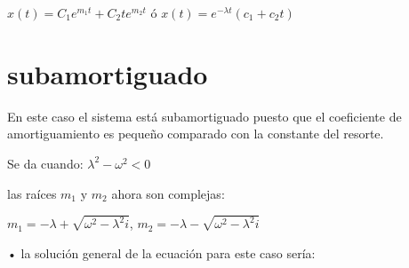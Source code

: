 \documentclass[12pt,a4paper]{article}
\begin{document}
 
 $x(t) = C_{1}e^{m_{1}t} + C_{2}te^{m_{2}t}$ \hspace{0.8cm} ó \hspace{0.8cm} $x(t) = e^{-\lambda t}(c_{1} + c_{2}t)$
 
 \begin{figure}[h]

        \centering


\end{figure} 






\section{subamortiguado}
En este caso el sistema está subamortiguado puesto que
el coeficiente de amortiguamiento es pequeño comparado con la constante del resorte.\\

 \vspace{0.6cm}
 
Se da cuando: \hspace{0.8cm}   $\lambda^{2}  - \omega^{2} < 0$

\vspace{0.6cm}

las raíces $m_{1}$ y $m_{2}$ ahora son complejas:\\ 

\begin{center}

$m_{1} = -\lambda + \sqrt{\omega^{2}-\lambda^{2}i}$,\hspace{0.8cm}   $m_{2} = -\lambda - \sqrt{\omega^{2}-\lambda^{2}i}$
\end{center}

\vspace{0.6cm}

 • la solución general de la ecuación para este caso sería:\\
 
\end{document}
